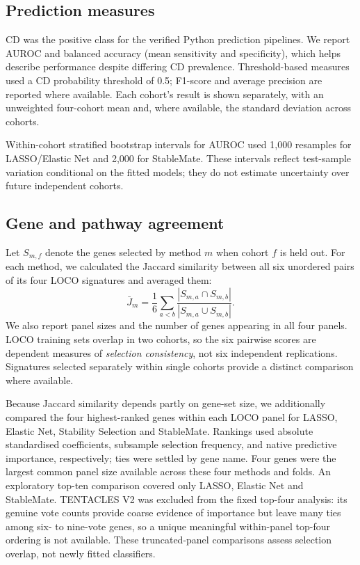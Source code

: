 \subsection{Prediction measures}
\label{sec:predictive_metrics}
CD was the positive class for the verified Python prediction pipelines. We report AUROC and balanced accuracy (mean sensitivity and specificity), which helps describe performance despite differing CD prevalence. Threshold-based measures used a CD probability threshold of 0.5; F1-score and average precision are reported where available. Each cohort's result is shown separately, with an unweighted four-cohort mean and, where available, the standard deviation across cohorts.

Within-cohort stratified bootstrap intervals for AUROC used 1,000 resamples for LASSO/Elastic Net and 2,000 for StableMate. These intervals reflect test-sample variation conditional on the fitted models; they do not estimate uncertainty over future independent cohorts.

\subsection{Gene and pathway agreement}
\label{sec:reproducibility_metrics}
Let $S_{m,f}$ denote the genes selected by method $m$ when cohort $f$ is held out. For each method, we calculated the Jaccard similarity between all six unordered pairs of its four LOCO signatures and averaged them:
\begin{equation}
\bar{J}_m=\frac{1}{6}\sum_{a<b}
\frac{|S_{m,a}\cap S_{m,b}|}{|S_{m,a}\cup S_{m,b}|}.
\label{eq:jaccard}
\end{equation}
We also report panel sizes and the number of genes appearing in all four panels. LOCO training sets overlap in two cohorts, so the six pairwise scores are dependent measures of \emph{selection consistency}, not six independent replications. Signatures selected separately within single cohorts provide a distinct comparison where available.

Because Jaccard similarity depends partly on gene-set size, we additionally compared the four highest-ranked genes within each LOCO panel for LASSO, Elastic Net, Stability Selection and StableMate. Rankings used absolute standardised coefficients, subsample selection frequency, and native predictive importance, respectively; ties were settled by gene name. Four genes were the largest common panel size available across these four methods and folds. An exploratory top-ten comparison covered only LASSO, Elastic Net and StableMate. TENTACLES V2 was excluded from the fixed top-four analysis: its genuine vote counts provide coarse evidence of importance but leave many ties among six- to nine-vote genes, so a unique meaningful within-panel top-four ordering is not available. These truncated-panel comparisons assess selection overlap, not newly fitted classifiers.

